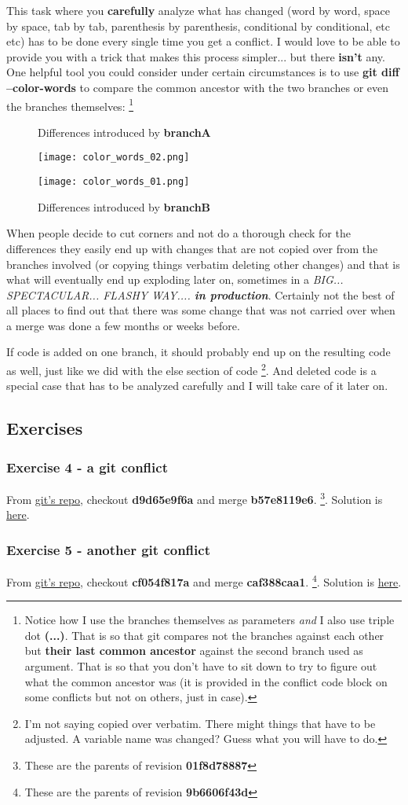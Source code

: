 This task where you {\bf carefully} analyze what has changed (word by word, space by space, tab by tab, parenthesis by parenthesis,
conditional by conditional, etc etc) has to be done every single time you get a conflict. I would love to be able to provide you with
a trick that makes this process simpler... but there {\bf isn't} any. One helpful tool you could consider under
certain circumstances is to use {\bf git diff --color-words} to compare the common ancestor with the
two branches or even the branches themselves:
\footnote{Notice how I use the branches themselves as parameters {\it and} I also use triple dot {\bf (...)}. That is so that git compares
not the branches against each other but {\bf their last common ancestor} against the second branch used as argument. That is so that you don't have
to sit down to try to figure out what the common ancestor was (it is provided in the conflict code block on some conflicts but not on
others, just in case).}


\begin{figure}
	\centering
	\caption{Differences introduced by {\bf branchA}}
	\texttt{[image: color\_words\_02.png]}
	\caption{Differences introduced by {\bf branchB}}
	\texttt{[image: color\_words\_01.png]}
\end{figure}

When people decide to cut corners and not do a thorough check for the differences they easily end up with changes that are
not copied over from the branches involved (or copying things verbatim deleting other changes) and that is what will
eventually end up exploding later on, sometimes in a {\it BIG... SPECTACULAR... FLASHY WAY.... {\bf in production}}. Certainly not
the best of all places to find out that there was some change that was not carried over when a merge was done a few
months or weeks before.

If code is added on one branch, it should probably end up on the resulting code as well, just like we did with the else section of
code \footnote{I'm not saying copied over verbatim. There might things that have to be adjusted. A variable name was changed? Guess
what you will have to do.}. And deleted code is a special case that has to be analyzed carefully and I will take care of it later on.

\subsection{Exercises}
\subsubsection{Exercise 4 - a git conflict}
From \hyperref[git_repo]{git's repo}, checkout {\bf d9d65e9f6a} and merge {\bf b57e8119e6}.
\footnote{These are the parents of revision {\bf 01f8d78887}}. Solution is \hyperref[exercise_04]{here}.

\subsubsection{Exercise 5 - another git conflict}
From \hyperref[git_repo]{git's repo}, checkout {\bf cf054f817a} and merge {\bf caf388caa1}.
\footnote{These are the parents of revision {\bf 9b6606f43d}}. Solution is \hyperref[exercise_05]{here}.
